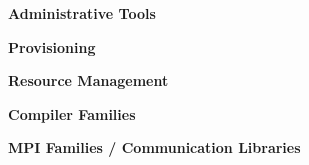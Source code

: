 


\newcommand{\firstColWidth}{5.3cm}
\newcommand{\secondColWidth}{1.25cm}

\vspace*{1.0cm}

\begin{table}[h]
\caption{\bf Administrative Tools} \vspace*{\captionSpace{}} \label{table:admin}

\end{table}
\vspace*{0.5cm}

\renewcommand{\firstColWidth}{6.25cm}
\renewcommand{\secondColWidth}{1.25cm}

\begin{table}[h!]
\caption{\bf Provisioning} \vspace*{\captionSpace{}} \label{table:provisioning}

\vspace*{\tabSpaceBot{}}
\end{table}
\fi

\renewcommand{\firstColWidth}{4.1cm}
\renewcommand{\secondColWidth}{1.8cm}

\begin{table}[h!]
\caption{\bf Resource Management} \vspace*{\captionSpace{}} \label{table:rms}

\vspace*{\tabSpaceBot{}}
\end{table}

\renewcommand{\firstColWidth}{4.7cm}

\begin{table}[h!]
\caption{\bf Compiler Families} \vspace*{\captionSpace{}} \label{table:compiler-families}

\vspace*{\tabSpaceBot{}}
\end{table}

\renewcommand{\firstColWidth}{4.7cm}

\begin{table}[h!]
\caption{\bf MPI Families / Communication Libraries} \vspace*{\captionSpace{}} \label{table:mpi-families}

\vspace*{\tabSpaceBot{}}
\end{table}

